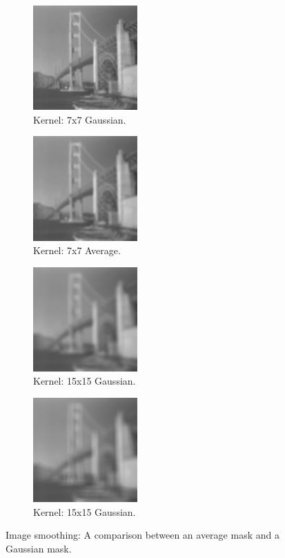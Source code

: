 \documentclass[letterpaper,10pt]{article}
\begin{document}
  \begin{figure}[hbtp]
    \centering
    \begin{subfigure}{4cm}
      \includegraphics[width=4cm]{images/smoothing_sf_gaussian_7.png}
      \caption{Kernel: 7x7 Gaussian.}
    \end{subfigure}
    \begin{subfigure}{4cm}
      \includegraphics[width=4cm]{images/smoothing_sf_average_7.png}
      \caption{Kernel: 7x7 Average.}
    \end{subfigure}
    \begin{subfigure}{4cm}
      \includegraphics[width=4cm]{images/smoothing_sf_gaussian_15.png}
      \caption{Kernel: 15x15 Gaussian.}
    \end{subfigure}
    \begin{subfigure}{4cm}
      \includegraphics[width=4cm]{images/smoothing_sf_average_15.png}
      \caption{Kernel: 15x15 Gaussian.}
    \end{subfigure}
    \caption{Image smoothing: A comparison between an average mask and a Gaussian mask.}
    \label{fig:smoothingsf}
  \end{figure}
\end{document}
